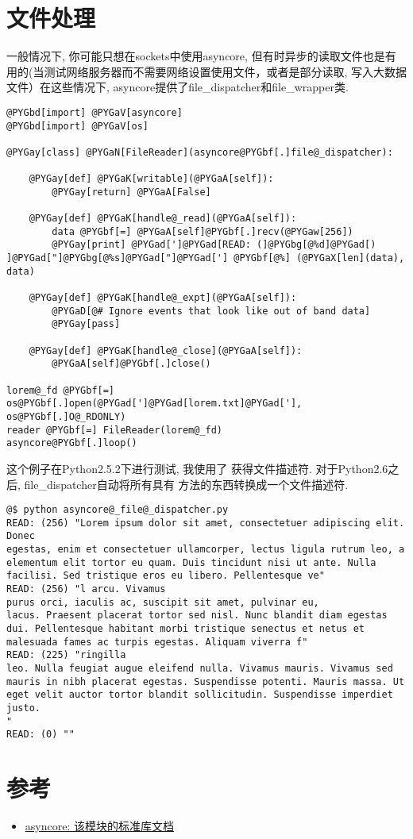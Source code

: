 \documentclass[a4paper,10pt,english]{manual}
\begin{document}
\section{文件处理}

一般情况下, 你可能只想在sockets中使用asyncore, 但有时异步的读取文件也是有用的(当测试网络服务器而不需要网络设置使用文件，或者是部分读取, 写入大数据文件）在这些情况下, asyncore提供了file\_dispatcher和file\_wrapper类.

\begin{Verbatim}[commandchars=@\[\]]
@PYGbd[import] @PYGaV[asyncore]
@PYGbd[import] @PYGaV[os]

@PYGay[class] @PYGaN[FileReader](asyncore@PYGbf[.]file@_dispatcher):

    @PYGay[def] @PYGaK[writable](@PYGaA[self]):
        @PYGay[return] @PYGaA[False]

    @PYGay[def] @PYGaK[handle@_read](@PYGaA[self]):
        data @PYGbf[=] @PYGaA[self]@PYGbf[.]recv(@PYGaw[256])
        @PYGay[print] @PYGad[']@PYGad[READ: (]@PYGbg[@%d]@PYGad[) ]@PYGad["]@PYGbg[@%s]@PYGad["]@PYGad['] @PYGbf[@%] (@PYGaX[len](data), data)

    @PYGay[def] @PYGaK[handle@_expt](@PYGaA[self]):
        @PYGaD[@# Ignore events that look like out of band data]
        @PYGay[pass]

    @PYGay[def] @PYGaK[handle@_close](@PYGaA[self]):
        @PYGaA[self]@PYGbf[.]close()

lorem@_fd @PYGbf[=] os@PYGbf[.]open(@PYGad[']@PYGad[lorem.txt]@PYGad['], os@PYGbf[.]O@_RDONLY)
reader @PYGbf[=] FileReader(lorem@_fd)
asyncore@PYGbf[.]loop()
\end{Verbatim}

这个例子在Python2.5.2下进行测试, 我使用了  获得文件描述符. 对于Python2.6之后, file\_dispatcher自动将所有具有  方法的东西转换成一个文件描述符.

\begin{Verbatim}[commandchars=@\[\]]
@$ python asyncore@_file@_dispatcher.py
READ: (256) "Lorem ipsum dolor sit amet, consectetuer adipiscing elit. Donec
egestas, enim et consectetuer ullamcorper, lectus ligula rutrum leo, a
elementum elit tortor eu quam. Duis tincidunt nisi ut ante. Nulla
facilisi. Sed tristique eros eu libero. Pellentesque ve"
READ: (256) "l arcu. Vivamus
purus orci, iaculis ac, suscipit sit amet, pulvinar eu,
lacus. Praesent placerat tortor sed nisl. Nunc blandit diam egestas
dui. Pellentesque habitant morbi tristique senectus et netus et
malesuada fames ac turpis egestas. Aliquam viverra f"
READ: (225) "ringilla
leo. Nulla feugiat augue eleifend nulla. Vivamus mauris. Vivamus sed
mauris in nibh placerat egestas. Suspendisse potenti. Mauris massa. Ut
eget velit auctor tortor blandit sollicitudin. Suspendisse imperdiet
justo.
"
READ: (0) ""
\end{Verbatim}


\section{参考}
\begin{itemize}
\item {} 
\href{http://docs.python.org/library/asyncore.html}{asyncore: 该模块的标准库文档}

\end{itemize}
\end{document}
